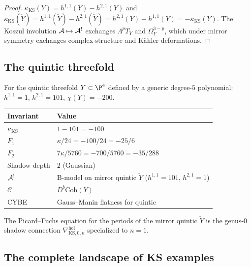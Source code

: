 \begin{proof}
$\kappa_{\mathrm{KS}}(Y) = h^{1,1}(Y) - h^{2,1}(Y)$ and
$\kappa_{\mathrm{KS}}(\check{Y}) = h^{1,1}(\check{Y}) - h^{2,1}(\check{Y})
= h^{2,1}(Y) - h^{1,1}(Y) = -\kappa_{\mathrm{KS}}(Y)$.
The Koszul involution $\mathcal{A} \mapsto \mathcal{A}^!$ exchanges $\Lambda^p T_Y$
and $\Omega^{3-p}_Y$, which under mirror symmetry exchanges
complex-structure and K\"ahler deformations.
\end{proof}


\subsection{The quintic threefold}

\begin{computation}
For the quintic threefold $Y \subset \P^4$ defined by a generic
degree-$5$ polynomial: $h^{1,1} = 1$, $h^{2,1} = 101$,
$\chi(Y) = -200$.
\begin{center}
\renewcommand{\arraystretch}{1.2}
\small
\begin{tabular}{ll}
\textbf{Invariant} & \textbf{Value} \\
\hline
$\kappa_{\mathrm{KS}}$ & $1 - 101 = -100$ \\
$F_1$ & $\kappa/24 = -100/24 = -25/6$ \\
$F_2$ & $7\kappa/5760 = -700/5760 = -35/288$ \\
Shadow depth & $2$ (Gaussian) \\
$\mathcal{A}^!$ & B-model on mirror quintic $\check{Y}$
 ($h^{1,1} = 101$, $h^{2,1} = 1$) \\
$\mathcal{C}$ & $D^b\mathrm{Coh}(Y)$ \\
CYBE & Gauss--Manin flatness for quintic
\end{tabular}
\end{center}
The Picard--Fuchs equation for the periods of the mirror quintic
$\check{Y}$ is the genus-$0$ shadow connection
$\nabla^{\mathrm{hol}}_{\mathrm{KS},0,n}$ specialized to $n = 1$.
\end{computation}


\subsection{The complete landscape of KS examples}

